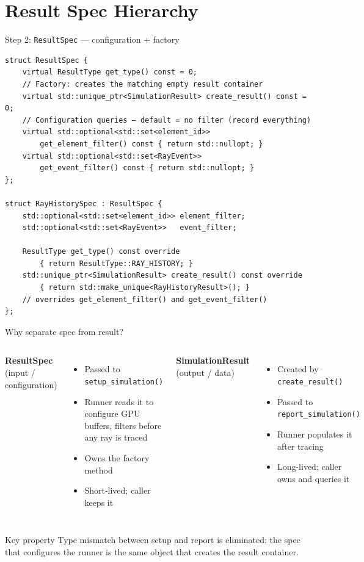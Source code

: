 \documentclass{beamer}
\begin{document}
\section{Result Spec Hierarchy}

\begin{frame}[fragile]{Step 2: \texttt{ResultSpec} — configuration + factory}
\begin{lstlisting}
struct ResultSpec {
    virtual ResultType get_type() const = 0;
    // Factory: creates the matching empty result container
    virtual std::unique_ptr<SimulationResult> create_result() const = 0;
    // Configuration queries — default = no filter (record everything)
    virtual std::optional<std::set<element_id>>
        get_element_filter() const { return std::nullopt; }
    virtual std::optional<std::set<RayEvent>>
        get_event_filter() const { return std::nullopt; }
};

struct RayHistorySpec : ResultSpec {
    std::optional<std::set<element_id>> element_filter;
    std::optional<std::set<RayEvent>>   event_filter;

    ResultType get_type() const override
        { return ResultType::RAY_HISTORY; }
    std::unique_ptr<SimulationResult> create_result() const override
        { return std::make_unique<RayHistoryResult>(); }
    // overrides get_element_filter() and get_event_filter()
};
\end{lstlisting}
\end{frame}

\begin{frame}{Why separate spec from result?}
\begin{columns}[T]
\textbf{ResultSpec} (input / configuration)
\begin{itemize}
  \item Passed to \lstinline|setup_simulation()|
  \item Runner reads it to configure GPU buffers, filters before any ray is traced
  \item Owns the factory method
  \item Short-lived; caller keeps it
\end{itemize}
\textbf{SimulationResult} (output / data)
\begin{itemize}
  \item Created by \lstinline|create_result()|
  \item Passed to \lstinline|report_simulation()|
  \item Runner populates it after tracing
  \item Long-lived; caller owns and queries it
\end{itemize}
\end{columns}
\vspace{1em}
\begin{block}{Key property}
Type mismatch between setup and report is eliminated: the spec that configures the runner is the same object that creates the result container.
\end{block}
\end{frame}
\end{document}
